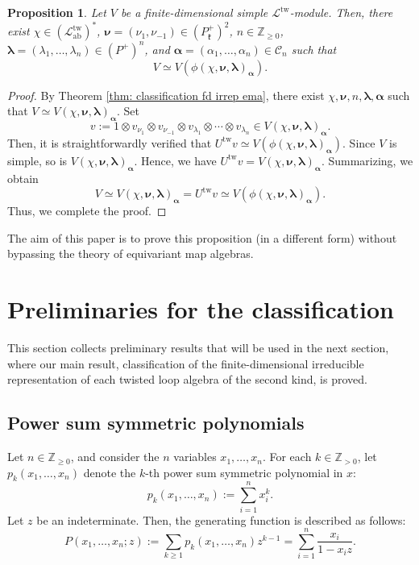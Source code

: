\documentclass[12pt,a4paper]{amsart}
\newtheorem{prop}[thm]{Proposition}
\theoremstyle{definition}
\numberwithin{equation}{subsection}
\begin{document}
\begin{prop}
  Let $V$ be a finite-dimensional simple $\mathcal{L}^{\mathrm{tw}}$-module.
  Then, there exist $\chi \in (\mathcal{L}^{\mathrm{tw}}_\mathrm{ab})^*$, ${\boldsymbol \nu} = (\nu_1,\nu_{-1}) \in (P_\mathfrak{k}^+)^2$, $n \in \mathbb{Z}_{\geq 0}$, ${\boldsymbol \lambda} = ( \lambda_1,\dots,\lambda_n) \in (P^+)^n$, and ${\boldsymbol \alpha} = (\alpha_1,\dots,\alpha_n) \in \mathcal{C}_n$ such that
  \[
    V \simeq V(\phi(\chi,{\boldsymbol \nu},{\boldsymbol \lambda})_{{\boldsymbol \alpha}}).
  \]
\end{prop}
\begin{proof}
  By Theorem \ref{thm: classification fd irrep ema}, there exist $\chi,{\boldsymbol \nu},n,{\boldsymbol \lambda},{\boldsymbol \alpha}$ such that $V \simeq V(\chi,{\boldsymbol \nu},{\boldsymbol \lambda})_{\boldsymbol \alpha}$.
  Set
  \[
    v := 1 \otimes v_{\nu_1} \otimes v_{\nu_{-1}} \otimes v_{\lambda_1} \otimes \cdots \otimes v_{\lambda_n} \in V(\chi,{\boldsymbol \nu},{\boldsymbol \lambda})_{\boldsymbol \alpha}.
  \]
  Then, it is straightforwardly verified that $U^\mathrm{tw} v \simeq V(\phi(\chi,{\boldsymbol \nu},{\boldsymbol \lambda})_{\boldsymbol \alpha})$.
  Since $V$ is simple, so is $V(\chi,{\boldsymbol \nu},{\boldsymbol \lambda})_{{\boldsymbol \alpha}}$.
  Hence, we have $U^\mathrm{tw} v = V(\chi,{\boldsymbol \nu},{\boldsymbol \lambda})_{\boldsymbol \alpha}$.
  Summarizing, we obtain
  \[
    V \simeq V(\chi,{\boldsymbol \nu},{\boldsymbol \lambda})_{\boldsymbol \alpha} = U^\mathrm{tw} v \simeq V(\phi(\chi,{\boldsymbol \nu},{\boldsymbol \lambda})_{\boldsymbol \alpha}).
  \]
  Thus, we complete the proof.
\end{proof}

The aim of this paper is to prove this proposition (in a different form) without bypassing the theory of equivariant map algebras.



\section{Preliminaries for the classification}\label{sect: prelim}
This section collects preliminary results that will be used in the next section, where our main result, classification of the finite-dimensional irreducible representation of each twisted loop algebra of the second kind, is proved.

\subsection{Power sum symmetric polynomials}
Let $n \in \mathbb{Z}_{\geq 0}$, and consider the $n$ variables $x_1,\dots,x_n$.
For each $k \in \mathbb{Z}_{> 0}$, let $p_k(x_1,\dots,x_n)$ denote the $k$-th power sum symmetric polynomial in $x$:
\[
  p_k(x_1,\dots,x_n) := \sum_{i=1}^n x_i^k.
\]
Let $z$ be an indeterminate.
Then, the generating function is described as follows:
\[
  P(x_1,\dots,x_n;z) := \sum_{k \geq 1} p_k(x_1,\dots,x_n) z^{k-1} = \sum_{i=1}^n \frac{x_i}{1-x_iz}.
\]
\end{document}
